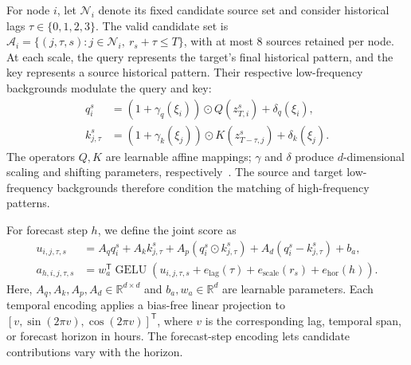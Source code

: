 For node \(i\), let \(\mathcal{N}_i\) denote its fixed candidate source set and consider historical lags \(\tau\in\{0,1,2,3\}\). The valid candidate set is \(\mathcal{A}_i=\{(j,\tau,s):j\in\mathcal{N}_i,\ r_s+\tau\leq T\}\), with at most 8 sources retained per node. At each scale, the query represents the target's final historical pattern, and the key represents a source historical pattern. Their respective low-frequency backgrounds modulate the query and key:
\begin{equation}
\label{eq:background-conditioned-qk}
\begin{aligned}
q_i^s&=(1+\gamma_q(\xi_i))\odot Q(z^s_{T,i})+\delta_q(\xi_i),\\
k_{j,\tau}^s&=(1+\gamma_k(\xi_j))\odot K(z^s_{T-\tau,j})+\delta_k(\xi_j).
\end{aligned}
\end{equation}
The operators \(Q,K\) are learnable affine mappings; \(\gamma\) and \(\delta\) produce \(d\)-dimensional scaling and shifting parameters, respectively~\cite{ref45}. The source and target low-frequency backgrounds therefore condition the matching of high-frequency patterns.

For forecast step \(h\), we define the joint score as
\begin{equation}
\label{eq:joint-message-score}
\begin{aligned}
u_{i,j,\tau,s}
&=A_q q_i^s+A_k k_{j,\tau}^s
+A_p(q_i^s\odot k_{j,\tau}^s)+A_d(q_i^s-k_{j,\tau}^s)+b_a,\\
a_{h,i,j,\tau,s}
&=w_a^{\mathsf T}\operatorname{GELU}\!\left(
u_{i,j,\tau,s}+e_{\mathrm{lag}}(\tau)+e_{\mathrm{scale}}(r_s)+e_{\mathrm{hor}}(h)\right).
\end{aligned}
\end{equation}
Here, \(A_q,A_k,A_p,A_d\in\mathbb{R}^{d\times d}\) and \(b_a,w_a\in\mathbb{R}^{d}\) are learnable parameters. Each temporal encoding applies a bias-free linear projection to \([v,\sin(2\pi v),\cos(2\pi v)]^{\mathsf T}\), where \(v\) is the corresponding lag, temporal span, or forecast horizon in hours. The forecast-step encoding lets candidate contributions vary with the horizon.

